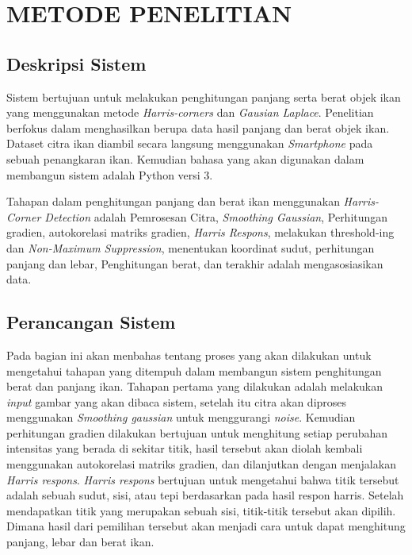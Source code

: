 
\chapter{METODE PENELITIAN}

\section{\textbf{Deskripsi Sistem}}
    Sistem bertujuan untuk melakukan penghitungan panjang serta berat objek ikan yang menggunakan
metode \emph{Harris-corners} dan \emph{Gausian Laplace}. Penelitian berfokus dalam menghasilkan berupa
data hasil panjang dan berat objek ikan. Dataset citra ikan diambil secara langsung menggunakan \emph{Smartphone} pada sebuah
penangkaran ikan. Kemudian bahasa yang akan digunakan dalam membangun sistem adalah Python versi 3.

Tahapan dalam penghitungan panjang dan berat ikan menggunakan \emph{Harris-Corner Detection} adalah Pemrosesan Citra,
\emph{Smoothing Gaussian}, Perhitungan gradien, autokorelasi matriks gradien, \emph{Harris Respons}, melakukan threshold-ing dan \emph{Non-Maximum Suppression}, menentukan koordinat sudut, perhitungan panjang dan lebar, Penghitungan berat,
dan terakhir adalah mengasosiasikan data.

\section{\textbf{Perancangan Sistem}}
    Pada bagian ini akan menbahas tentang proses yang akan dilakukan untuk mengetahui tahapan yang ditempuh
dalam membangun sistem penghitungan berat dan panjang ikan. Tahapan pertama yang dilakukan adalah melakukan \emph{input} gambar
yang akan dibaca sistem, setelah itu citra akan diproses menggunakan \emph{Smoothing gaussian} untuk menggurangi \emph{noise}. Kemudian perhitungan gradien dilakukan bertujuan untuk menghitung setiap perubahan intensitas yang berada di sekitar titik, 
hasil tersebut akan diolah kembali menggunakan autokorelasi matriks gradien, dan dilanjutkan dengan menjalakan \emph{Harris respons}. \emph{Harris respons} bertujuan untuk mengetahui bahwa titik tersebut adalah sebuah sudut, sisi, atau tepi berdasarkan pada hasil respon harris. 
Setelah mendapatkan titik yang merupakan sebuah sisi, titik-titik tersebut akan dipilih. 
Dimana hasil dari pemilihan tersebut akan menjadi cara untuk dapat menghitung panjang, lebar dan berat ikan.


